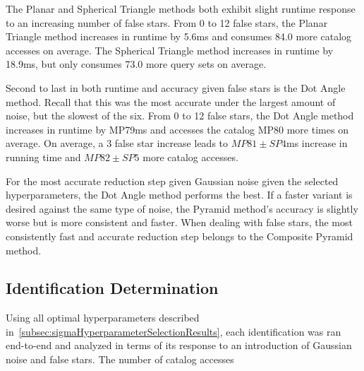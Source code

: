 The Planar and Spherical Triangle methods both exhibit slight runtime response to an increasing number of false
stars.
From 0 to 12 false stars, the Planar Triangle method increases in runtime by 5.6ms and consumes 84.0 more catalog
accesses on average.
The Spherical Triangle method increases in runtime by 18.9ms, but only consumes 73.0 more query sets on average.

Second to last in both runtime and accuracy given false stars is the Dot Angle method.
Recall that this was the most accurate under the largest amount of noise, but the slowest of the six.
From 0 to 12 false stars, the Dot Angle method increases in runtime by MP79ms and accesses the catalog MP80 more times
on average.
On average, a 3 false star increase leads to $MP81 \pm SP4$ms increase in running time and $MP82 \pm SP5$ more
catalog accesses.

For the most accurate reduction step given Gaussian noise given the selected hyperparameters, the Dot Angle method
performs the best.
If a faster variant is desired against the same type of noise, the Pyramid method's accuracy is slightly worse but
is more consistent and faster.
When dealing with false stars, the most consistently fast and accurate reduction step belongs to the Composite Pyramid
method.

\subsection{Identification Determination}\label{subsec:identificationDeterminationResults}
Using all optimal hyperparameters described in~\autoref{subsec:sigmaHyperparameterSelectionResults}, each identification
was ran end-to-end and analyzed in terms of its response to an introduction of Gaussian noise and false stars.
The number of catalog accesses

\begin{figure}
\end{figure}

